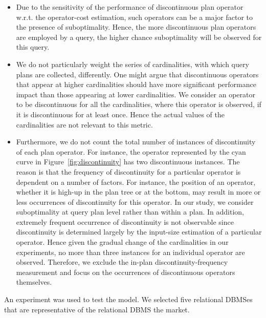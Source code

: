 \begin{itemize}
\item{} Due to the sensitivity of the performance of discontinuous plan
operator w.r.t. the operator-cost estimation, such operators can be a major
factor to the presence of suboptimality. Hence, the more discontinuous plan
operators are employed by a query, the higher chance suboptimality will be
observed for this query.

\item{} We do not particularly weight the series of cardinalities, with which
query plans are collected, differently. One might argue that discontinuous
operators that appear at higher cardinalities should have more significant
performance impact than those appearing at lower cardinalities.
We consider an operator to be discontinuous for all the cardinalities, where
this operator is observed, if it is discontinuous for at least once.
Hence the actual values of the cardinalities are not relevant to this metric.

\item{} Furthermore, we do not count the total number of instances of
discontinuity of each plan operator. For instance, the operator represented by
the cyan curve in Figure~\ref{fig:discontinuity} has two discontinuous
instances. The reason is that the frequency of discontinuity for a particular
operator is dependent on a number of factors. For instance, the position
of an operator, whether it is high-up in the plan tree or at the bottom,
may result in more or less occurrences of discontinuity for this operator.
In our study, we consider suboptimality at query plan level rather than within
a plan. In addition, extremely frequent occurrence of discontinuity is not
observable since discontinuity is determined largely by the input-size
estimation of a particular operator. Hence given the gradual change of the
cardinalities in our experiments, no more than three instances for an
individual operator are observed. Therefore, we exclude the in-plan
discontinuity-frequency measurement and focus on the occurrences of
discontinuous operators themselves.
\end{itemize}


An experiment was used to test the model. We selected five relational
DBMSes that are representative of the relational DBMS the market.

